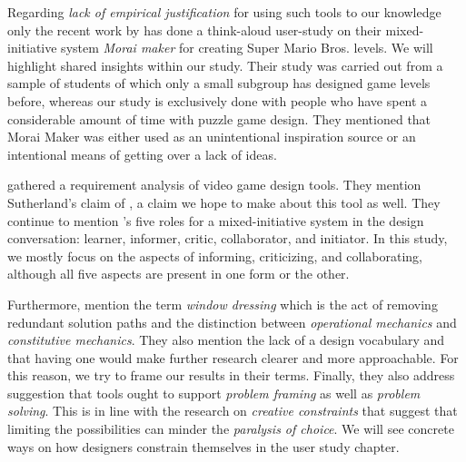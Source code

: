 Regarding \textit{lack of empirical justification} for using such tools to our knowledge only the recent work by \cite{Guzdial} has done a think-aloud user-study on their mixed-initiative system \textit{Morai maker} for creating Super Mario Bros. levels. We will highlight shared insights within our study.
Their study was carried out from a sample of students of which only a small subgroup has designed game levels before, whereas our study is exclusively done with people who have spent a considerable amount of time with puzzle game design. They mentioned that Morai Maker was either used as an unintentional inspiration source or an intentional means of getting over a lack of ideas.

\cite{Nelson2009} gathered a requirement analysis of video game design tools. They mention Sutherland's claim of , a claim we hope to make about this tool as well. They continue to mention \cite{Lawson1997}'s five roles for a mixed-initiative system in the design conversation: learner, informer, critic, collaborator, and initiator. In this study, we mostly focus on the aspects of informing, criticizing, and collaborating, although all five aspects are present in one form or the other.

Furthermore, \cite{Nelson2009} mention the term \textit{window dressing} which is the act of removing redundant solution paths and the distinction between  \textit{operational mechanics} and \textit{constitutive mechanics}. They also mention the lack of a design vocabulary and that having one would make further research clearer and more approachable. For this reason, we try to frame our results in their terms. Finally, they also address \cite{Giaccardi2008} suggestion that tools ought to support \textit{problem framing} as well as \textit{problem solving}. This is in line with the research on \textit{creative constraints} that suggest that limiting the possibilities can minder the \textit{paralysis of choice}. We will see concrete ways on how designers constrain themselves in the user study chapter.
